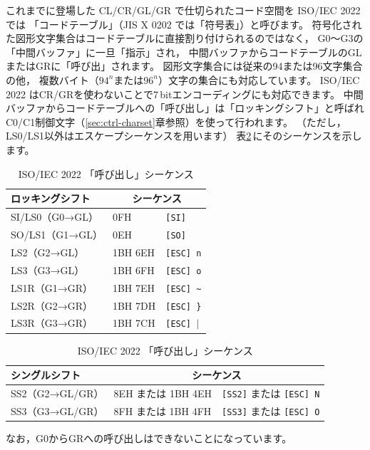 \documentclass[a4j,10pt,fleqn,uplatex]{jsarticle}
\begin{document}
これまでに登場した CL/CR/GL/GR で仕切られたコード空間を ISO/IEC 2022 では
「コードテーブル」（JIS X 0202 では「符号表」）と呼びます。
符号化された図形文字集合はコードテーブルに直接割り付けられるのではなく，
G0～G3の「中間バッファ」に一旦「指示」され，
中間バッファからコードテーブルのGLまたはGRに「呼び出」されます。
図形文字集合には従来の94または96文字集合の他，
複数バイト（$94^{n}$または$96^{n}$）文字の集合にも対応しています。
ISO/IEC 2022 はCR/GRを使わないことで7\,bitエンコーディングにも対応できます。
中間バッファからコードテーブルへの「呼び出し」は「ロッキングシフト」と呼ばれ
C0/C1制御文字（\ref{sec:ctrl-charset}章参照）を使って行われます。
（ただし，LS0/LS1以外はエスケープシーケンスを用います）
表\ref{tbl:ISO2022-shift}\,にそのシーケンスを示します。
\begin{table}[htp]
\begin{center}\begin{tabular}{|l|l|l|}
    \hline
    ロッキングシフト & \multicolumn{2}{c|}{シーケンス} \\ \hline
    \hline
    SI/LS0（G0→GL） & 0FH      & \texttt{[SI]} \\ \hline
    SO/LS1（G1→GL） & 0EH      & \texttt{[SO]} \\ \hline
    LS2（G2→GL）    & 1BH 6EH  & \texttt{[ESC] n} \\ \hline
    LS3（G3→GL）    & 1BH 6FH  & \texttt{[ESC] o} \\ \hline
    LS1R（G1→GR）   & 1BH 7EH  & \texttt{[ESC] \~{}} \\ \hline
    LS2R（G2→GR）   & 1BH 7DH  & \texttt{[ESC] \}} \\ \hline
    LS3R（G3→GR）   & 1BH 7CH  & \texttt{[ESC] $|$} \\ \hline
\end{tabular}\end{center}
\begin{center}\begin{tabular}{|l|l|l|}
    \hline
    シングルシフト   & \multicolumn{2}{c|}{シーケンス} \\ \hline
    \hline
    SS2（G2→GL/GR） & 8EH または 1BH 4EH  & \texttt{[SS2]} または \texttt{[ESC] N} \\ \hline
    SS3（G3→GL/GR） & 8FH または 1BH 4FH  & \texttt{[SS3]} または \texttt{[ESC] O} \\ \hline
\end{tabular}\end{center}
\caption{ISO/IEC 2022 「呼び出し」シーケンス}\label{tbl:ISO2022-shift}
\end{table}%
なお，G0からGRへの呼び出しはできないことになっています。
\end{document}
